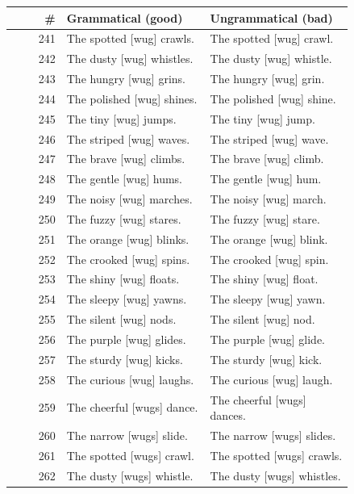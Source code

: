 \begin{table}[p]
\centering
\footnotesize
\begin{tabular}{@{}rp{0.42\linewidth}p{0.42\linewidth}@{}}
\hline
\# & Grammatical (good) & Ungrammatical (bad) \\
\hline
241 & The spotted {[}wug{]} crawls. & The spotted {[}wug{]} crawl. \\
242 & The dusty {[}wug{]} whistles. & The dusty {[}wug{]} whistle. \\
243 & The hungry {[}wug{]} grins. & The hungry {[}wug{]} grin. \\
244 & The polished {[}wug{]} shines. & The polished {[}wug{]} shine. \\
245 & The tiny {[}wug{]} jumps. & The tiny {[}wug{]} jump. \\
246 & The striped {[}wug{]} waves. & The striped {[}wug{]} wave. \\
247 & The brave {[}wug{]} climbs. & The brave {[}wug{]} climb. \\
248 & The gentle {[}wug{]} hums. & The gentle {[}wug{]} hum. \\
249 & The noisy {[}wug{]} marches. & The noisy {[}wug{]} march. \\
250 & The fuzzy {[}wug{]} stares. & The fuzzy {[}wug{]} stare. \\
251 & The orange {[}wug{]} blinks. & The orange {[}wug{]} blink. \\
252 & The crooked {[}wug{]} spins. & The crooked {[}wug{]} spin. \\
253 & The shiny {[}wug{]} floats. & The shiny {[}wug{]} float. \\
254 & The sleepy {[}wug{]} yawns. & The sleepy {[}wug{]} yawn. \\
255 & The silent {[}wug{]} nods. & The silent {[}wug{]} nod. \\
256 & The purple {[}wug{]} glides. & The purple {[}wug{]} glide. \\
257 & The sturdy {[}wug{]} kicks. & The sturdy {[}wug{]} kick. \\
258 & The curious {[}wug{]} laughs. & The curious {[}wug{]} laugh. \\
259 & The cheerful {[}wugs{]} dance. & The cheerful {[}wugs{]} dances. \\
260 & The narrow {[}wugs{]} slide. & The narrow {[}wugs{]} slides. \\
261 & The spotted {[}wugs{]} crawl. & The spotted {[}wugs{]} crawls. \\
262 & The dusty {[}wugs{]} whistle. & The dusty {[}wugs{]} whistles. \\

\end{tabular}
\end{table}
